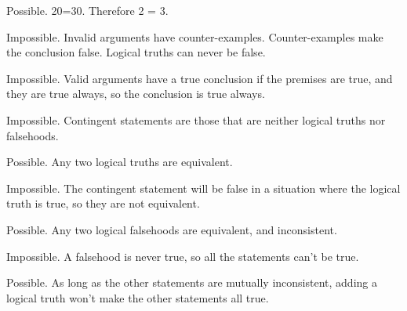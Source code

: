 \documentclass[PHIL101-Textbook.tex]{subfiles}
\begin{document}
\begin{earg}
\item Possible. 20=30. Therefore 2 = 3. %

\item Impossible. Invalid arguments have counter-examples. Counter-examples make the conclusion false. Logical truths can never be false. %

\item Impossible. Valid arguments have a true conclusion if the premises are true, and they are true always, so the conclusion is true always. %

\item Impossible. Contingent statements are those that are neither logical truths nor falsehoods. %

\item Possible. Any two logical truths are equivalent. %

\item Impossible. The contingent statement will be false in a situation where the logical truth is true, so they are not equivalent. %

\item Possible. Any two logical falsehoods are equivalent, and  inconsistent. %

\item Impossible. A falsehood is never true, so all the statements can't be true. %

\item Possible. As long as the other statements are mutually inconsistent, adding a logical truth won't make the other statements all true. %
\end{earg}
\end{document}
